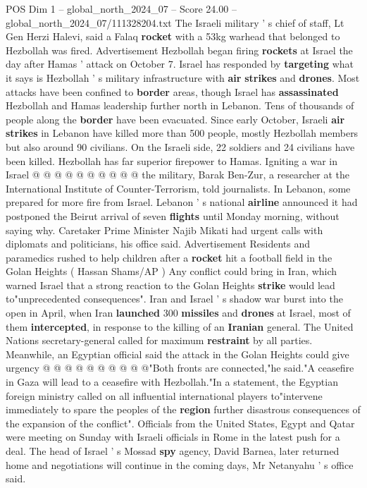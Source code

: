 \begin{textsample}{POS Dim 1 – global\_north\_2024\_07 – Score 24.00 – global\_north\_2024\_07/111328204.txt}
The Israeli military ' s chief of staff, Lt Gen Herzi Halevi, said a Falaq \textbf{rocket} with a 53kg warhead that belonged to Hezbollah was fired.
Advertisement Hezbollah began firing \textbf{rockets} at Israel the day after Hamas ' attack on October 7.
Israel has responded by \textbf{targeting} what it says is Hezbollah ' s military infrastructure with \textbf{air} \textbf{strikes} and \textbf{drones}.
Most attacks have been confined to \textbf{border} areas, though Israel has \textbf{assassinated} Hezbollah and Hamas leadership further north in Lebanon.
Tens of thousands of people along the \textbf{border} have been evacuated.
Since early October, Israeli \textbf{air} \textbf{strikes} in Lebanon have killed more than 500 people, mostly Hezbollah members but also around 90 civilians.
On the Israeli side, 22 soldiers and 24 civilians have been killed.
Hezbollah has far superior firepower to Hamas.
Igniting a war in Israel @ @ @ @ @ @ @ @ @ @ the military, Barak Ben-Zur, a researcher at the International Institute of Counter-Terrorism, told journalists.
In Lebanon, some prepared for more fire from Israel.
Lebanon ' s national \textbf{airline} announced it had postponed the Beirut arrival of seven \textbf{flights} until Monday morning, without saying why.
Caretaker Prime Minister Najib Mikati had urgent calls with diplomats and politicians, his office said.
Advertisement Residents and paramedics rushed to help children after a \textbf{rocket} hit a football field in the Golan Heights ( Hassan Shams/AP ) Any conflict could bring in Iran, which warned Israel that a strong reaction to the Golan Heights \textbf{strike} would lead to"unprecedented consequences".
Iran and Israel ' s shadow war burst into the open in April, when Iran \textbf{launched} 300 \textbf{missiles} and \textbf{drones} at Israel, most of them \textbf{intercepted}, in response to the killing of an \textbf{Iranian} general.
The United Nations secretary-general called for maximum \textbf{restraint} by all parties.
Meanwhile, an Egyptian official said the attack in the Golan Heights could give urgency @ @ @ @ @ @ @ @ @ @"Both fronts are connected,"he said."A ceasefire in Gaza will lead to a ceasefire with Hezbollah."In a statement, the Egyptian foreign ministry called on all influential international players to"intervene immediately to spare the peoples of the \textbf{region} further disastrous consequences of the expansion of the conflict".
Officials from the United States, Egypt and Qatar were meeting on Sunday with Israeli officials in Rome in the latest push for a deal.
The head of Israel ' s Mossad \textbf{spy} agency, David Barnea, later returned home and negotiations will continue in the coming days, Mr Netanyahu ' s office said.

\end{textsample}
